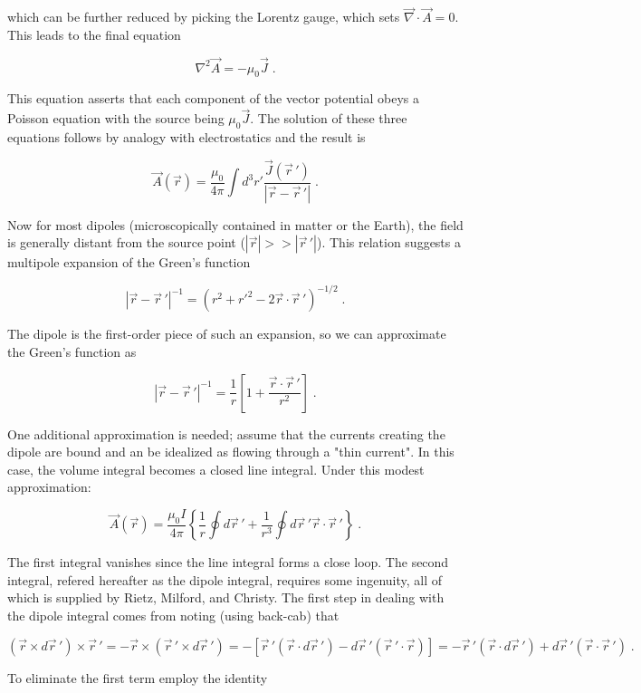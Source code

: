 \documentclass[12pt]{article}
\begin{document}
which can be further reduced by picking the Lorentz gauge, which sets $ \vec \nabla \cdot \vec A = 0 $.  This leads to the final equation

\[ \nabla^2 \vec A = -\mu_0 \vec J \; .\]

This equation asserts that each component of the vector potential obeys a Poisson equation with the source being $\mu_0 \vec J$. The solution of these three equations follows by analogy with electrostatics and the result is

\[ \vec A(\vec r) = \frac{\mu_0}{4 \pi} \int d^3 r' \frac{\vec J(\vec r \,')}{|\vec r - \vec r \,'|} \; . \]

Now for most dipoles (microscopically contained in matter or the Earth), the field is generally distant from the source point ($|\vec r| >> |\vec r \, '| $).  This relation suggests a multipole expansion of the Green's function

\[ |\vec r - \vec r \,'|^{-1} = (r^2 + r'^2 - 2 \vec r \cdot \vec r \, ')^{-1/2} \; . \]

The dipole is the first-order piece of such an expansion, so we can approximate the Green's function as 

\[ |\vec r - \vec r \,'|^{-1} = \frac{1}{r} \left[ 1 + \frac{\vec r \cdot \vec r \,'}{r^2} \right] \; . \]

One additional approximation is needed; assume that the currents creating the dipole are bound and an be idealized as flowing through a "thin current".  In this case, the volume integral becomes a closed line integral.  Under this modest approximation:

\[ \vec A(\vec r) = \frac{\mu_0 I}{4 \pi} \left\{ \frac{1}{r} \oint d \vec r \,'  + \frac{1}{r^3} \oint d \vec r \,' \vec r \cdot \vec r \,' \right \} \; . \] 

The first integral vanishes since the line integral forms a close loop. The second integral, refered hereafter as the dipole integral, requires some ingenuity, all of which is supplied by Rietz, Milford, and Christy.  The first step in dealing with the dipole integral comes from noting (using back-cab) that 

\[ (\vec r \times d \vec r \,') \times \vec r \,' = - \vec r \times (\vec r \,' \times d \vec r \,') = - [ \vec r \,' (\vec r \cdot d \vec r \,') - d \vec r \,' (\vec r \,' \cdot \vec r) ] = - \vec r \,' (\vec r \cdot d \vec r \,') + d\vec r \,' (\vec r \cdot \vec r \,') \; .\]

To eliminate the first term employ the identity
\end{document}
